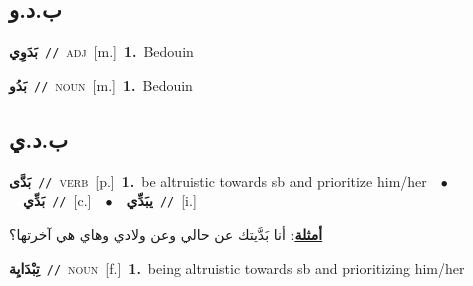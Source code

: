 \documentclass[10pt,a4paper,twoside]{article} %
\begin{document}
\begin{multicols}{2}
\vspace{-3mm}
\subsection*{\color{blue}\foreignlanguage{arabic}{ب.د.و}\color{blue}{}} 

{\setlength\topsep{0pt}\textbf{\foreignlanguage{arabic}{بَدَوِي}}\ {\color{gray}\texttt{//}\color{black}}\ \textsc{adj}\ [m.]\ \textbf{1.}~Bedouin\ } \vspace{2mm}

{\setlength\topsep{0pt}\textbf{\foreignlanguage{arabic}{بَدُو}}\ {\color{gray}\texttt{//}\color{black}}\ \textsc{noun}\ [m.]\ \textbf{1.}~Bedouin\ } \vspace{2mm}

\vspace{-3mm}
\subsection*{\color{blue}\foreignlanguage{arabic}{ب.د.ي}\color{blue}{}} 

{\setlength\topsep{0pt}\textbf{\foreignlanguage{arabic}{بَدَّى}}\ {\color{gray}\texttt{//}\color{black}}\ \textsc{verb}\ [p.]\ \textbf{1.}~be altruistic towards sb and prioritize him/her\ \ $\bullet$\ \ \setlength\topsep{0pt}\textbf{\foreignlanguage{arabic}{بَدِّي}}\ {\color{gray}\texttt{//}\color{black}}\ [c.]\ \ $\bullet$\ \ \setlength\topsep{0pt}\textbf{\foreignlanguage{arabic}{يبَدِّي}}\ {\color{gray}\texttt{//}\color{black}}\ [i.]\  \begin{flushright}\color{gray}\foreignlanguage{arabic}{\textbf{\underline{\foreignlanguage{arabic}{أمثلة}}}: أنا بَدَّيتك عن حالي وعن ولادي وهاي هي آخرتها؟}\end{flushright}\color{black}} \vspace{2mm}

{\setlength\topsep{0pt}\textbf{\foreignlanguage{arabic}{تِبْدَايِة}}\ {\color{gray}\texttt{//}\color{black}}\ \textsc{noun}\ [f.]\ \textbf{1.}~being altruistic towards sb and prioritizing him/her\ } \vspace{2mm}


\end{multicols}
\end{document}
